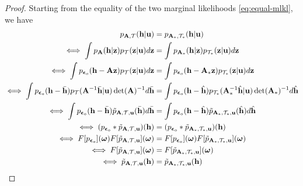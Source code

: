 \documentclass[10pt]{article} %
\theoremstyle{plain}
\theoremstyle{definition}
\begin{document}
\begin{proof}
    Starting from the equality of the two marginal likelihoods \eqref{eq:equal-mlkl}, we have
    \begin{align}
        p_{\mathbf{A},\mathcal{T}}(\mathbf{h}|\mathbf{u})&=p_{\mathbf{A}_{*},\mathcal{T}_*}(\mathbf{h}|\mathbf{u})\\   
        \iff \int p_{\mathbf{A}}(\mathbf{h}|\mathbf{z})p_{\mathcal{T}}(\mathbf{z}|\mathbf{u})d\mathbf{z} &= \int p_{\mathbf{A}_{*}}(\mathbf{h}|\mathbf{z})p_{\mathcal{T}_{*}}(\mathbf{z}|\mathbf{u})d\mathbf{z}\\
        \iff \int p_{\boldsymbol{\epsilon}_o}(\mathbf{h}-\mathbf{A}\mathbf{z})p_{\mathcal{T}}(\mathbf{z}|\mathbf{u})d\mathbf{z} &= \int p_{\boldsymbol{\epsilon}_o}(\mathbf{h}-\mathbf{A}_{*}\mathbf{z})p_{\mathcal{T}_{*}}(\mathbf{z}|\mathbf{u})d\mathbf{z}\\
        \iff \int p_{\boldsymbol{\epsilon}_o}(\mathbf{h}-\Bar{\mathbf{h}})p_{\mathcal{T}}(\mathbf{A}^{-1}\Bar{\mathbf{h}}|\mathbf{u})\det(\mathbf{A})^{-1}d\Bar{\mathbf{h}} &= \int p_{\boldsymbol{\epsilon}_o}(\mathbf{h}-\Hat{\mathbf{h}})p_{\mathcal{T}_{*}}(\mathbf{A}_{*}^{-1}\Hat{\mathbf{h}}|\mathbf{u})\det(\mathbf{A}_{*})^{-1}d\Hat{\mathbf{h}}\label{eq:reduce-1}\\
        \iff \int p_{\boldsymbol{\epsilon}_o}(\mathbf{h}-\Bar{\mathbf{h}})\Tilde{p}_{\mathbf{A},\mathcal{T},\mathbf{u}}(\Bar{\mathbf{h}})d\Bar{\mathbf{h}} &= \int p_{\boldsymbol{\epsilon}_o}(\mathbf{h}-\Hat{\mathbf{h}})\Tilde{p}_{\mathbf{A}_{*},\mathcal{T}_{*},\mathbf{u}}(\Hat{\mathbf{h}})d\Hat{\mathbf{h}}\label{eq:reduce-2}\\
        \iff (p_{\boldsymbol{\epsilon}_o}*\Tilde{p}_{\mathbf{A},\mathcal{T},\mathbf{u}})(\mathbf{h})&=(p_{\boldsymbol{\epsilon}_o}*\Tilde{p}_{\mathbf{A}_{*},\mathcal{T}_{*},\mathbf{u}})(\mathbf{h})\label{eq:reduce-3}\\
        \iff F[p_{\boldsymbol{\epsilon}_o}](\boldsymbol{\omega})F[\Tilde{p}_{\mathbf{A},\mathcal{T},\mathbf{u}}](\boldsymbol{\omega})&=F[p_{\boldsymbol{\epsilon}_o}](\boldsymbol{\omega})F[\Tilde{p}_{\mathbf{A}_{*},\mathcal{T}_{*},\mathbf{u}}](\boldsymbol{\omega})\label{eq:reduce-4}\\
        \iff F[\Tilde{p}_{\mathbf{A},\mathcal{T},\mathbf{u}}](\boldsymbol{\omega})&=F[\Tilde{p}_{\mathbf{A}_{*},\mathcal{T}_{*},\mathbf{u}}](\boldsymbol{\omega})\label{eq:reduce-5}\\
        \iff \Tilde{p}_{\mathbf{A},\mathcal{T},\mathbf{u}}(\mathbf{h}) &= \Tilde{p}_{\mathbf{A}_{*},\mathcal{T}_{*},\mathbf{u}}(\mathbf{h})\\

\end{align}
\end{proof}
\end{document}
